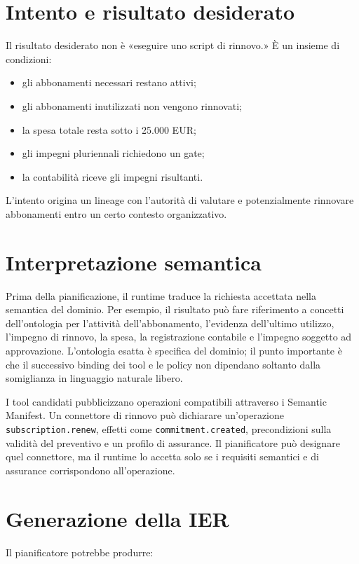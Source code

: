 \documentclass[10pt,oneside,openany]{book}
\newcommand{\mono}[1]{\texttt{#1}}
\begin{document}
\section{Intento e risultato desiderato}
Il risultato desiderato non è «eseguire uno script di rinnovo.» È un insieme di condizioni:

\begin{itemize}
\item gli abbonamenti necessari restano attivi;
\item gli abbonamenti inutilizzati non vengono rinnovati;
\item la spesa totale resta sotto i 25.000 EUR;
\item gli impegni pluriennali richiedono un gate;
\item la contabilità riceve gli impegni risultanti.
\end{itemize}

L'intento origina un lineage con l'autorità di valutare e potenzialmente rinnovare abbonamenti entro un certo contesto organizzativo.

\section{Interpretazione semantica}
Prima della pianificazione, il runtime traduce la richiesta accettata nella semantica del dominio. Per esempio, il risultato può fare riferimento a concetti dell'ontologia per l'attività dell'abbonamento, l'evidenza dell'ultimo utilizzo, l'impegno di rinnovo, la spesa, la registrazione contabile e l'impegno soggetto ad approvazione. L'ontologia esatta è specifica del dominio; il punto importante è che il successivo binding dei tool e le policy non dipendano soltanto dalla somiglianza in linguaggio naturale libero.

I tool candidati pubblicizzano operazioni compatibili attraverso i Semantic Manifest. Un connettore di rinnovo può dichiarare un'operazione \mono{subscription.renew}, effetti come \mono{commitment.created}, precondizioni sulla validità del preventivo e un profilo di assurance. Il pianificatore può designare quel connettore, ma il runtime lo accetta solo se i requisiti semantici e di assurance corrispondono all'operazione.

\section{Generazione della IER}
Il pianificatore potrebbe produrre:
\end{document}
